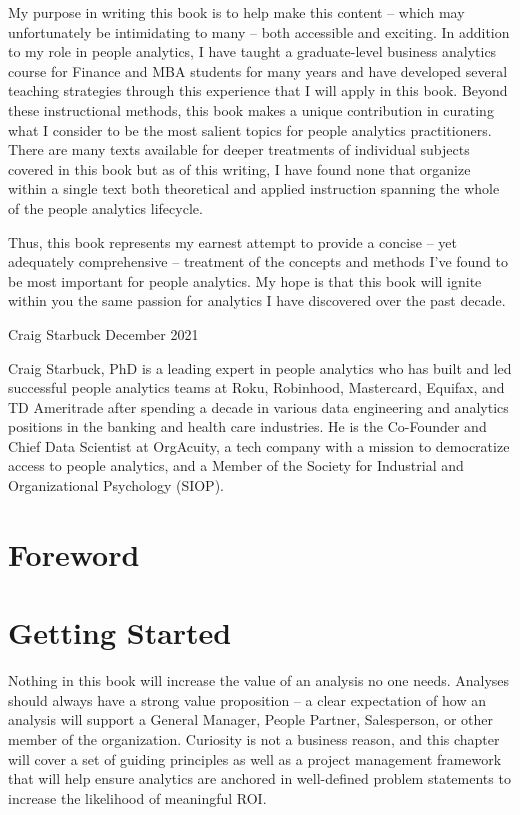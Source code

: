\documentclass[
]{book}
\begin{document}
My purpose in writing this book is to help make this content -- which may unfortunately be intimidating to many -- both accessible and exciting. In addition to my role in people analytics, I have taught a graduate-level business analytics course for Finance and MBA students for many years and have developed several teaching strategies through this experience that I will apply in this book. Beyond these instructional methods, this book makes a unique contribution in curating what I consider to be the most salient topics for people analytics practitioners. There are many texts available for deeper treatments of individual subjects covered in this book but as of this writing, I have found none that organize within a single text both theoretical and applied instruction spanning the whole of the people analytics lifecycle.

Thus, this book represents my earnest attempt to provide a concise -- yet adequately comprehensive -- treatment of the concepts and methods I've found to be most important for people analytics. My hope is that this book will ignite within you the same passion for analytics I have discovered over the past decade.

Craig Starbuck
December 2021

Craig Starbuck, PhD is a leading expert in people analytics who has built and led successful people analytics teams at Roku, Robinhood, Mastercard, Equifax, and TD Ameritrade after spending a decade in various data engineering and analytics positions in the banking and health care industries. He is the Co-Founder and Chief Data Scientist at OrgAcuity, a tech company with a mission to democratize access to people analytics, and a Member of the Society for Industrial and Organizational Psychology (SIOP).

\hypertarget{foreword}{%
\chapter*{Foreword}\label{foreword}}

\hypertarget{getting-started}{%
\chapter{Getting Started}\label{getting-started}}

Nothing in this book will increase the value of an analysis no one needs. Analyses should always have a strong value proposition -- a clear expectation of how an analysis will support a General Manager, People Partner, Salesperson, or other member of the organization. Curiosity is not a business reason, and this chapter will cover a set of guiding principles as well as a project management framework that will help ensure analytics are anchored in well-defined problem statements to increase the likelihood of meaningful ROI.
\end{document}
